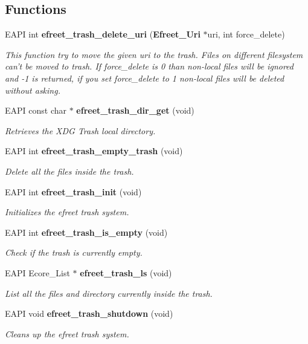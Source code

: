 \subsection*{Functions}
\begin{CompactItemize}
\item 
EAPI int {\bf efreet\_\-trash\_\-delete\_\-uri} ({\bf Efreet\_\-Uri} $\ast$uri, int force\_\-delete)
\begin{CompactList}\small\item\em This function try to move the given uri to the trash. Files on different filesystem can't be moved to trash. If force\_\-delete is 0 than non-local files will be ignored and -1 is returned, if you set force\_\-delete to 1 non-local files will be deleted without asking. \item\end{CompactList}\item 
EAPI const char $\ast$ {\bf efreet\_\-trash\_\-dir\_\-get} (void)
\begin{CompactList}\small\item\em Retrieves the XDG Trash local directory. \item\end{CompactList}\item 
EAPI int {\bf efreet\_\-trash\_\-empty\_\-trash} (void)
\begin{CompactList}\small\item\em Delete all the files inside the trash. \item\end{CompactList}\item 
EAPI int {\bf efreet\_\-trash\_\-init} (void)
\begin{CompactList}\small\item\em Initializes the efreet trash system. \item\end{CompactList}\item 
EAPI int {\bf efreet\_\-trash\_\-is\_\-empty} (void)
\begin{CompactList}\small\item\em Check if the trash is currently empty. \item\end{CompactList}\item 
EAPI Ecore\_\-List $\ast$ {\bf efreet\_\-trash\_\-ls} (void)
\begin{CompactList}\small\item\em List all the files and directory currently inside the trash. \item\end{CompactList}\item 
EAPI void {\bf efreet\_\-trash\_\-shutdown} (void)
\begin{CompactList}\small\item\em Cleans up the efreet trash system. \item\end{CompactList}\end{CompactItemize}


